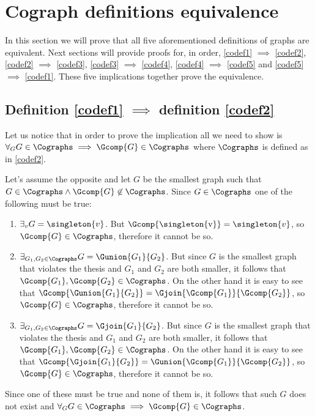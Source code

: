 
\section{Cograph definitions equivalence}\label{r:codefeq}

In this section we will prove that all five aforementioned definitions of graphs are equivalent. Next sections will provide proofs for, in order, \ref{codef1} $\implies$ \ref{codef2}, \ref{codef2} $\implies$ \ref{codef3}, \ref{codef3} $\implies$ \ref{codef4}, \ref{codef4} $\implies$ \ref{codef5} and \ref{codef5} $\implies$ \ref{codef1}. These five implications together prove the equivalence.

\subsection{Definition \ref{codef1} $\implies$ definition \ref{codef2}}

Let us notice that in order to prove the implication all we need to show is $\forall_G G \in \Cographs \implies \Gcomp{G} \in \Cographs$ where $\Cographs$ is defined as in \ref{codef2}.

Let's assume the opposite and let $G$ be the smallest graph such that $G \in \Cographs \land \Gcomp{G} \not\in \Cographs$. Since $G \in \Cographs$ one of the following must be true:
\begin{enumerate}
    \item $\exists_v G = \singleton{v}$. But $\Gcomp{\mbox{\singleton{v}}\raisebox{3mm}{}} = \singleton{v}$, so $\Gcomp{G} \in \Cographs$, therefore it cannot be so.
    \item $\exists_{G_1, G_2 \in \Cographs} G = \Gunion{G_1}{G_2}$. But since $G$ is the smallest graph that violates the thesis and $G_1$ and $G_2$ are both smaller, it follows that $\Gcomp{G_1}, \Gcomp{G_2} \in \Cographs$. On the other hand it is easy to see that $\Gcomp{\Gunion{G_1}{G_2}} = \Gjoin{\Gcomp{G_1}}{\Gcomp{G_2}}$, so $\Gcomp{G} \in \Cographs$, therefore it cannot be so.
    \item $\exists_{G_1, G_2 \in \Cographs} G = \Gjoin{G_1}{G_2}$. But since $G$ is the smallest graph that violates the thesis and $G_1$ and $G_2$ are both smaller, it follows that $\Gcomp{G_1}, \Gcomp{G_2} \in \Cographs$. On the other hand it is easy to see that $\Gcomp{\Gjoin{G_1}{G_2}} = \Gunion{\Gcomp{G_1}}{\Gcomp{G_2}}$, so $\Gcomp{G} \in \Cographs$, therefore it cannot be so.
\end{enumerate}
Since one of these must be true and none of them is, it follows that such $G$ does not exist and $\forall_G G \in \Cographs \implies \Gcomp{G} \in \Cographs$.


